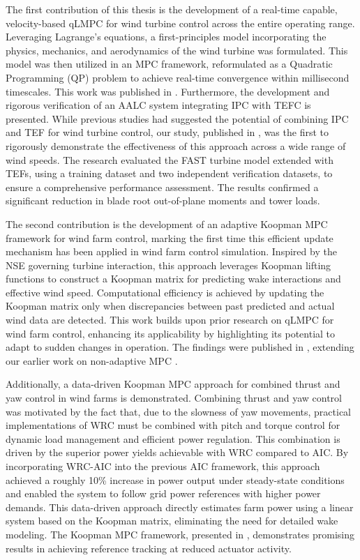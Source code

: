 The first contribution of this thesis is the development of a real-time capable, velocity-based qLMPC for wind turbine control across the entire operating range. Leveraging Lagrange's equations, a first-principles model incorporating the physics, mechanics, and aerodynamics of the wind turbine was formulated. This model was then utilized in an MPC framework, reformulated as a Quadratic Programming (QP) problem to achieve real-time convergence within millisecond timescales. This work was published in \cite{dittmer2021velocity}.
%
Furthermore, the development and rigorous verification of an AALC system integrating IPC with TEFC is presented. While previous studies had suggested the potential of combining IPC and TEF for wind turbine control, our study, published in \cite{dittmer2024combined}, was the first to rigorously demonstrate the effectiveness of this approach across a wide range of wind speeds. The research evaluated the FAST turbine model extended  with TEFs, using a training dataset and two independent verification datasets, to ensure a comprehensive performance assessment. The results confirmed a significant reduction in blade root out-of-plane moments and tower loads.

The second contribution is the development of an adaptive Koopman MPC framework for wind farm control, marking the first time this efficient update mechanism has been applied in wind farm control simulation. Inspired by the NSE governing turbine interaction, this approach leverages Koopman lifting functions to construct a Koopman matrix for predicting wake interactions and effective wind speed. Computational efficiency is achieved by updating the Koopman matrix only when discrepancies between past predicted and actual wind data are detected. This work builds upon prior research on qLMPC for wind farm control, enhancing its applicability by highlighting its potential to adapt to sudden changes in operation. The findings were published in \cite{dittmer2022data}, extending our earlier work on non-adaptive MPC \cite{sharan2022Koopman}.

Additionally, a data-driven Koopman MPC approach for combined thrust and yaw control in wind farms is demonstrated. Combining thrust and yaw control was motivated by the fact that, due to the slowness of yaw movements, practical implementations of WRC must be combined with pitch and torque control for dynamic load management and efficient power regulation. This combination is driven by the superior power yields achievable with WRC compared to AIC. By incorporating WRC-AIC into the previous AIC framework, this approach achieved a roughly 10\% increase in power output under steady-state conditions and enabled the system to follow grid power references with higher power demands. This data-driven approach directly estimates farm power using a linear system based on the Koopman matrix, eliminating the need for detailed wake modeling. The Koopman MPC framework, presented in \cite{dittmer2023koopman}, demonstrates promising results in achieving reference tracking at reduced actuator activity.


